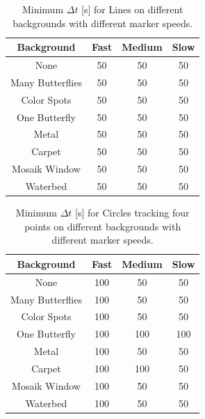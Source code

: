 \begin{table}[H]
\center
\begin{tabular}{|c|c|c|c|}
\hline
Background       & Fast & Medium & Slow \\ \hline
None             & 50   & 50     & 50   \\ \hline 
Many Butterflies & 50   & 50     & 50   \\ \hline 
Color Spots      & 50   & 50     & 50   \\ \hline 
One Butterfly    & 50   & 50     & 50   \\ \hline 
Metal            & 50   & 50     & 50   \\ \hline 
Carpet           & 50   & 50     & 50   \\ \hline 
Mosaik Window    & 50   & 50     & 50   \\ \hline 
Waterbed         & 50   & 50     & 50   \\ \hline 
\end{tabular}
\caption{Minimum $\Delta t$ [s] for Lines on different backgrounds with different marker speeds.}
 \label{tb:min_dt_lines}
\end{table}

\begin{table}[H]
\center
\begin{tabular}{|c|c|c|c|}
\hline
Background       & Fast & Medium & Slow \\ \hline
None             & 100  & 50     & 50   \\ \hline 
Many Butterflies & 100  & 50     & 50   \\ \hline 
Color Spots      & 100  & 50     & 50   \\ \hline 
One Butterfly    & 100  & 100    & 100  \\ \hline 
Metal            & 100  & 50     & 50   \\ \hline 
Carpet           & 100  & 100    & 50   \\ \hline 
Mosaik Window    & 100  & 50     & 50   \\ \hline 
Waterbed         & 100  & 50     & 50   \\ \hline 
\end{tabular}
\caption{Minimum $\Delta t$ [s] for Circles tracking four points on different backgrounds with different marker speeds.}
\label{tb:min_dt_circles}
\end{table}

